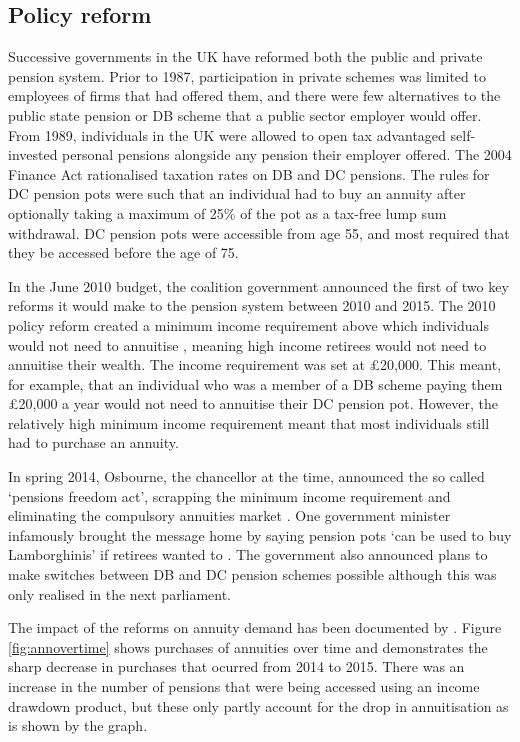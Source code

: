 \documentclass[12pt]{article}
\begin{document}
\subsection{Policy reform}

Successive governments in the UK have reformed both the public and
private pension system. Prior to 1987, participation in private schemes was
limited to employees of firms that had offered them, and there were few
alternatives to the public state pension or DB scheme that a public sector
employer would offer. From 1989, individuals in the UK were allowed to open tax
advantaged self-invested personal pensions alongside any pension their employer
offered. The 2004 Finance Act rationalised taxation rates on DB and DC pensions.
The rules for DC pension pots were such that an individual had to buy an annuity
after optionally taking a maximum of 25\% of the pot as a tax-free lump sum
withdrawal. DC pension pots were accessible from age 55, and most required that
they be accessed before the age of 75.

In the June 2010 budget, the coalition government announced the first of two key
reforms it would make to the pension system between 2010 and 2015. The 2010
policy reform created a minimum income requirement above which individuals would
not need to annuitise \citep{finance_act_hmt_2011}, meaning high income
retirees would not need to annuitise their wealth. The income requirement was
set at £20,000. This meant, for example, that an individual who was a member of
a DB scheme paying them £20,000 a year would not need to annuitise their DC
pension pot. However, the relatively high minimum income requirement meant that
most individuals still had to purchase an annuity.

In spring 2014, Osbourne, the chancellor at the time, announced the so called
`pensions freedom act', scrapping the minimum income requirement and eliminating
the compulsory annuities market \citep{pen_freedoms_hmt_2014}. One government
minister infamously brought the message home by saying pension pots `can be used
to buy Lamborghinis' if retirees wanted to \citep{guardian_lambos}. The
government also announced plans to make switches between DB and DC pension
schemes possible although this was only realised in the next parliament.

The impact of the reforms on annuity demand has been documented by
\cite{cannon_et_al_nier_2016}. Figure \ref{fig:annovertime} shows
purchases of annuities over time and demonstrates the sharp decrease in purchases
that ocurred from 2014 to 2015. There was an increase in the number of pensions
that were being accessed using an income drawdown product, but these only partly
account for the drop in annuitisation as is shown by the graph.
\end{document}
